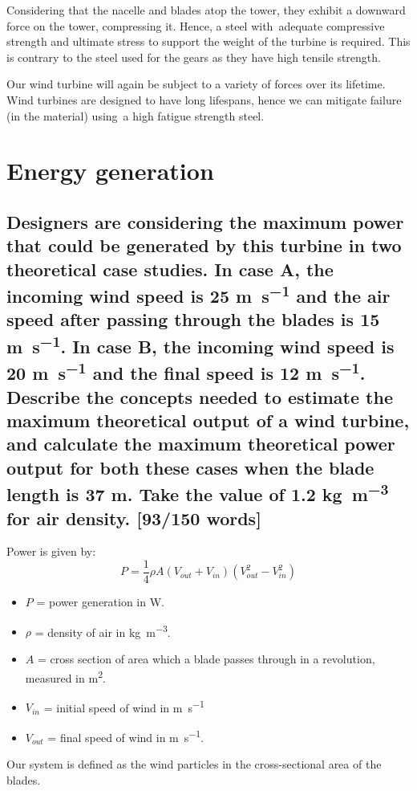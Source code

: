 \documentclass[12pt]{article}
\numberwithin{equation}{section}
\begin{document}
\begin{flushleft}
Considering that the nacelle and blades atop the tower, they exhibit a downward force on the tower, compressing it. Hence, a steel with adequate compressive strength and ultimate stress to support the weight of the turbine is required. This is contrary to the steel used for the gears as they have high tensile strength. 

Our wind turbine will again be subject to a variety of forces over its lifetime. Wind turbines are designed to have long lifespans, hence we can mitigate failure (in the material) using a high fatigue strength steel.  

\section{Energy generation}
\subsection{Designers are considering the maximum power that could be generated by this turbine in two theoretical case studies. In case A, the incoming wind speed is 25 \si{\meter\per\second} and the air speed after passing through the blades is 15 \si{\meter\per\second}. In case B, the incoming wind speed is 20 \si{\meter\per\second} and the final speed is 12 \si{\meter\per\second}. Describe the concepts needed to estimate the maximum theoretical output of a wind turbine, and calculate the maximum theoretical power output for both these cases when the blade length is 37 \si{\meter}. Take the value of 1.2 \si{\kg\per\meter\cubed} for air density. [93/150 words]}
Power is given by:
\begin{equation}
  P = \frac{1}{4} \rho A (V_{out} + V_{in})(V_{out}^2 - V_{in}^2)
\end{equation}
\begin{itemize}
  \item $P$ = power generation in \si{\watt}.
  \item $\rho$ = density of air in \si{\kg\per\meter\cubed}.
  \item $A$ = cross section of area which a blade passes through in a revolution, measured in \si{\meter\squared}.
  \item $V_{in}$ = initial speed of wind in \si{\meter\per\second}
  \item $V_{out}$ = final speed of wind in \si{\meter\per\second}.
\end{itemize}
Our system is defined as the wind particles in the cross-sectional area of the blades.

\end{flushleft}
\end{document}
